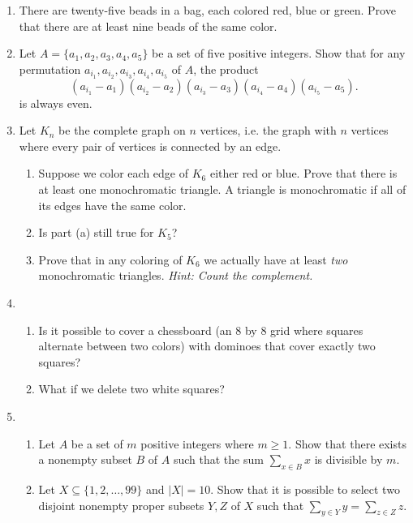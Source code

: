 \documentclass[11pt,letterpaper]{report}
\theoremstyle{definition}
\theoremstyle{remark}
\begin{document}
\begin{enumerate}
	\item There are twenty-five beads in a bag, each colored red, blue or green. Prove that there are at least nine beads of the same color.
	\vfill

	\item Let $A = \{a_1, a_2, a_3, a_4, a_5\}$ be a set of five positive integers. Show that for any permutation $a_{i_1}, a_{i_2}, a_{i_3}, a_{i_4}, a_{i_5}$ of $A$, the product
	\[
	(a_{i_1}-a_1)(a_{i_2}-a_2)(a_{i_3}-a_3)(a_{i_4}-a_4)(a_{i_5}-a_5).
	\]
	is always even.
	\vfill
	\item Let $K_n$ be the complete graph on $n$ vertices, i.e. the graph with $n$ vertices where every pair of vertices is connected by an edge. 
	\begin{enumerate}
		\item Suppose we color each edge of $K_6$ either red or blue. Prove that there is at least one monochromatic triangle. A triangle is monochromatic if all of its edges have the same color.
		\item Is part (a) still true for $K_5$?
		\item Prove that in any coloring of $K_6$ we actually have at least \textit{two} monochromatic triangles. \textit{Hint: Count the complement.}
	\end{enumerate}
	\vfill

	\item \begin{enumerate}
		\item Is it possible to cover a chessboard (an 8 by 8 grid where squares alternate between two colors) with dominoes that cover exactly two squares?
		\item What if we delete two white squares?
	\end{enumerate}

	\vfill
	
	\item \begin{enumerate}
		\item Let $A$ be a set of $m$ positive integers where $m\geq 1$. Show that there exists a nonempty subset $B$ of $A$ such that the sum $\sum_{x\in B}x$ is divisible by $m$.
		\item Let $X\subseteq \{1, 2, \ldots, 99\}$ and $|X| = 10$. Show that it is possible to select two disjoint nonempty proper subsets $Y, Z$ of $X$ such that $\sum_{y\in Y}y = \sum_{z\in Z}z$.
	\end{enumerate}
	\vfill
\end{enumerate}
\end{document}

